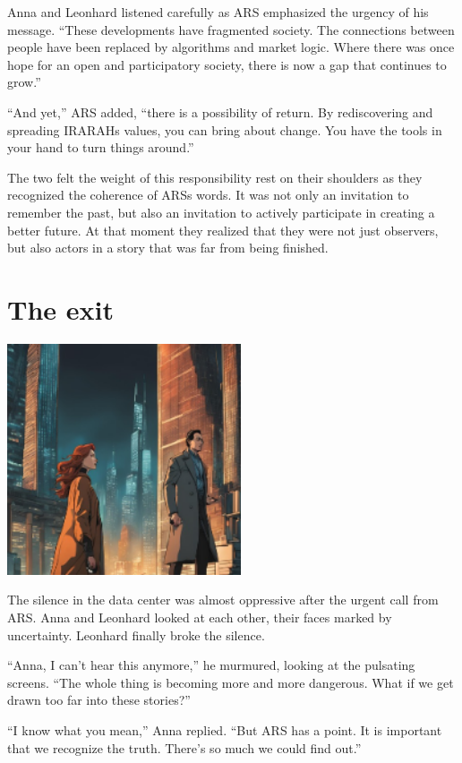 \documentclass[
]{article}
\begin{document}
Anna and Leonhard listened carefully as ARS emphasized the urgency of
his message. ``These developments have fragmented society. The
connections between people have been replaced by algorithms and market
logic. Where there was once hope for an open and participatory society,
there is now a gap that continues to grow.''

``And yet,'' ARS added, ``there is a possibility of return. By
rediscovering and spreading IRARAH\textquotesingle s values, you can
bring about change. You have the tools in your hand to turn things
around.''

The two felt the weight of this responsibility rest on their shoulders
as they recognized the coherence of ARS\textquotesingle s words. It was
not only an invitation to remember the past, but also an invitation to
actively participate in creating a better future. At that moment they
realized that they were not just observers, but also actors in a story
that was far from being finished.

\section{The exit}\label{the-exit}

\includegraphics[width=2.71875in,height=2.6875in]{media/image0006.png}

The silence in the data center was almost oppressive after the urgent
call from ARS. Anna and Leonhard looked at each other, their faces
marked by uncertainty. Leonhard finally broke the silence.

``Anna, I can't hear this anymore,'' he murmured, looking at the
pulsating screens. ``The whole thing is becoming more and more
dangerous. What if we get drawn too far into these stories?''

``I know what you mean,'' Anna replied. ``But ARS has a point. It is
important that we recognize the truth. There's so much we could find
out.''
\end{document}
